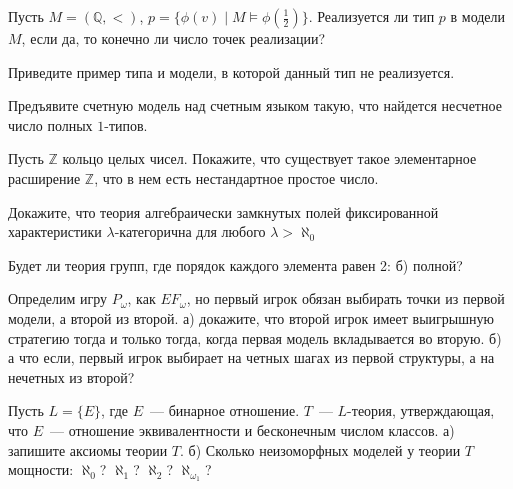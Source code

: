 \setcounter{curtask}{11}


\begin{task}
    Пусть $M = (\mathbb{Q}, <)$,
    $p = \{\phi(v) \mid M \models \phi(\frac{1}{2})\}$.
    Реализуется ли тип $p$ в модели $M$, если да, то конечно ли число точек
    реализации? 
\end{task}

\begin{task}
    Приведите пример типа и модели, в которой данный тип не реализуется.
\end{task}

\begin{task}
    Предъявите счетную модель над счетным языком такую, что найдется несчетное число
    полных $1$-типов.
\end{task}

\begin{task}
    Пусть $\mathbb{Z}$ кольцо целых чисел. Покажите, что существует такое
    элементарное расширение $\mathbb{Z}$, что в нем есть нестандартное простое 
    число.
\end{task}

\breakline 

\begin{ptask}{6}
    Докажите, что теория алгебраически замкнутых полей фиксированной характеристики
    $\lambda$-категорична для любого $\lambda > \aleph_0$
\end{ptask}

\begin{ptask}{7}
    Будет ли теория групп, где порядок каждого элемента равен 2:
    б) полной?
\end{ptask}

\begin{ptask}{9}
    Определим игру $P_{\omega}$, как $EF_{\omega}$, но первый игрок обязан выбирать
    точки из первой модели, а второй из второй.
	а) докажите, что второй игрок имеет выигрышную стратегию тогда и только тогда,
    когда первая модель вкладывается во вторую.
    б) а что если, первый игрок выбирает на четных шагах из первой структуры, а на
    нечетных из второй?
\end{ptask}

\begin{ptask}{10}
    Пусть $L = \{E\}$, где $E$~--- бинарное отношение. $T$~--- $L$-теория,
    утверждающая, что $E$~--- отношение эквивалентности и бесконечным числом классов.
    а) запишите аксиомы теории $T$.
    б) Сколько неизоморфных моделей у теории $T$ мощности: $\aleph_0$? $\aleph_1$?
    $\aleph_2$? $\aleph_{\omega_1}$?
\end{ptask}